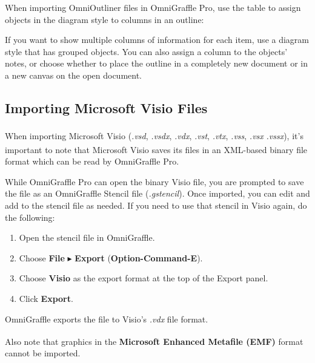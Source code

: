 \documentclass[../main.tex]{subfiles}
\begin{document}
\begin{ogpro}
  When importing OmniOutliner files in OmniGraffle Pro, use the table to assign objects in the
  diagram style to columns in an outline:


  If you want to show multiple columns of information for each item, use a diagram style that
  has grouped objects. You can also assign a column to the objects' notes, or choose whether
  to place the outline in a completely new document or in a new canvas on the open document.
\end{ogpro}

\subsection{Importing Microsoft Visio Files}

\begin{ogpro}
  When importing Microsoft\textsuperscript{\textregistered{}}
  Visio\textsuperscript{\textregistered{}} (\textit{.vsd}, \textit{.vsdx}, \textit{.vdx},
  \textit{.vst}, \textit{.vtx}, \textit{.vss}, \textit{.vsx} \textit{.vssx}), it's important to
  note that Microsoft\textsuperscript{\textregistered{}}
  Visio\textsuperscript{\textregistered{}} saves its files in an XML-based binary file format
  which can be read by OmniGraffle Pro.

  While OmniGraffle Pro can open the binary Visio file, you are prompted to save the file as an
  OmniGraffle Stencil file (\textit{.gstencil}). Once imported, you can edit and add to the
  stencil file as needed. If you need to use that stencil in Visio again, do the following:

  \begin{enumerate}
    \item Open the stencil file in OmniGraffle.
    \item Choose \textbf{File} $\blacktriangleright$ \textbf{Export}
      (\textbf{Option-Command-E}).
    \item Choose \textbf{Visio} as the export format at the top of the Export panel.
    \item Click \textbf{Export}.
  \end{enumerate}

  OmniGraffle exports the file to Visio's \textit{.vdx} file format.

  Also note that graphics in the \textbf{Microsoft\textsuperscript{\textregistered{}} Enhanced
  Metafile (EMF)} format cannot be imported.
\end{ogpro}
\end{document}
